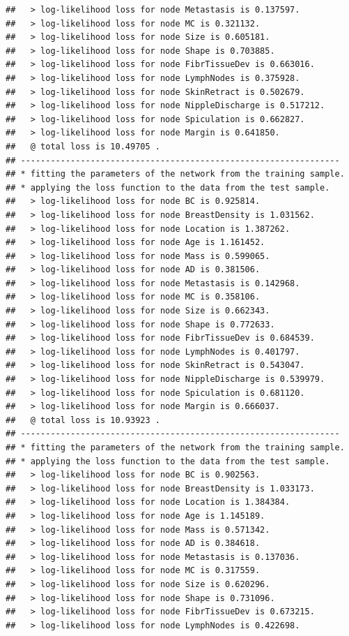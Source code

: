 \documentclass[]{article}
\begin{document}
\begin{verbatim}
##   > log-likelihood loss for node Metastasis is 0.137597.
##   > log-likelihood loss for node MC is 0.321132.
##   > log-likelihood loss for node Size is 0.605181.
##   > log-likelihood loss for node Shape is 0.703885.
##   > log-likelihood loss for node FibrTissueDev is 0.663016.
##   > log-likelihood loss for node LymphNodes is 0.375928.
##   > log-likelihood loss for node SkinRetract is 0.502679.
##   > log-likelihood loss for node NippleDischarge is 0.517212.
##   > log-likelihood loss for node Spiculation is 0.662827.
##   > log-likelihood loss for node Margin is 0.641850.
##   @ total loss is 10.49705 .
## ----------------------------------------------------------------
## * fitting the parameters of the network from the training sample.
## * applying the loss function to the data from the test sample.
##   > log-likelihood loss for node BC is 0.925814.
##   > log-likelihood loss for node BreastDensity is 1.031562.
##   > log-likelihood loss for node Location is 1.387262.
##   > log-likelihood loss for node Age is 1.161452.
##   > log-likelihood loss for node Mass is 0.599065.
##   > log-likelihood loss for node AD is 0.381506.
##   > log-likelihood loss for node Metastasis is 0.142968.
##   > log-likelihood loss for node MC is 0.358106.
##   > log-likelihood loss for node Size is 0.662343.
##   > log-likelihood loss for node Shape is 0.772633.
##   > log-likelihood loss for node FibrTissueDev is 0.684539.
##   > log-likelihood loss for node LymphNodes is 0.401797.
##   > log-likelihood loss for node SkinRetract is 0.543047.
##   > log-likelihood loss for node NippleDischarge is 0.539979.
##   > log-likelihood loss for node Spiculation is 0.681120.
##   > log-likelihood loss for node Margin is 0.666037.
##   @ total loss is 10.93923 .
## ----------------------------------------------------------------
## * fitting the parameters of the network from the training sample.
## * applying the loss function to the data from the test sample.
##   > log-likelihood loss for node BC is 0.902563.
##   > log-likelihood loss for node BreastDensity is 1.033173.
##   > log-likelihood loss for node Location is 1.384384.
##   > log-likelihood loss for node Age is 1.145189.
##   > log-likelihood loss for node Mass is 0.571342.
##   > log-likelihood loss for node AD is 0.384618.
##   > log-likelihood loss for node Metastasis is 0.137036.
##   > log-likelihood loss for node MC is 0.317559.
##   > log-likelihood loss for node Size is 0.620296.
##   > log-likelihood loss for node Shape is 0.731096.
##   > log-likelihood loss for node FibrTissueDev is 0.673215.
##   > log-likelihood loss for node LymphNodes is 0.422698.

\end{verbatim}
\end{document}
